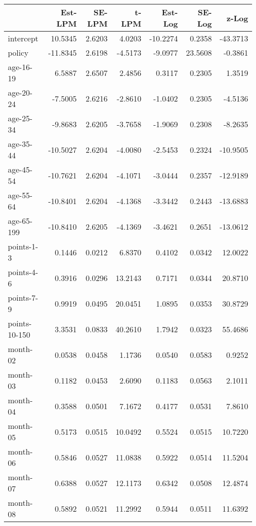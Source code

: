\documentclass[10pt]{article}
\begin{document}

\begin{table}[ht]
\centering
\begin{tabular}{lrrrrrr}
  \hline
 & Est-LPM & SE-LPM & t-LPM & Est-Log & SE-Log & z-Log \\ 
  \hline
intercept & 10.5345 & 2.6203 & 4.0203 & -10.2274 & 0.2358 & -43.3713 \\ 
  policy & -11.8345 & 2.6198 & -4.5173 & -9.0977 & 23.5608 & -0.3861 \\ 
  age-16-19 & 6.5887 & 2.6507 & 2.4856 & 0.3117 & 0.2305 & 1.3519 \\ 
  age-20-24 & -7.5005 & 2.6216 & -2.8610 & -1.0402 & 0.2305 & -4.5136 \\ 
  age-25-34 & -9.8683 & 2.6205 & -3.7658 & -1.9069 & 0.2308 & -8.2635 \\ 
  age-35-44 & -10.5027 & 2.6204 & -4.0080 & -2.5453 & 0.2324 & -10.9505 \\ 
  age-45-54 & -10.7621 & 2.6204 & -4.1071 & -3.0444 & 0.2357 & -12.9189 \\ 
  age-55-64 & -10.8401 & 2.6204 & -4.1368 & -3.3442 & 0.2443 & -13.6883 \\ 
  age-65-199 & -10.8410 & 2.6205 & -4.1369 & -3.4621 & 0.2651 & -13.0612 \\ 
  points-1-3 & 0.1446 & 0.0212 & 6.8370 & 0.4102 & 0.0342 & 12.0022 \\ 
  points-4-6 & 0.3916 & 0.0296 & 13.2143 & 0.7171 & 0.0344 & 20.8710 \\ 
  points-7-9 & 0.9919 & 0.0495 & 20.0451 & 1.0895 & 0.0353 & 30.8729 \\ 
  points-10-150 & 3.3531 & 0.0833 & 40.2610 & 1.7942 & 0.0323 & 55.4686 \\ 
  month-02 & 0.0538 & 0.0458 & 1.1736 & 0.0540 & 0.0583 & 0.9252 \\ 
  month-03 & 0.1182 & 0.0453 & 2.6090 & 0.1183 & 0.0563 & 2.1011 \\ 
  month-04 & 0.3588 & 0.0501 & 7.1672 & 0.4177 & 0.0531 & 7.8610 \\ 
  month-05 & 0.5173 & 0.0515 & 10.0492 & 0.5524 & 0.0515 & 10.7220 \\ 
  month-06 & 0.5846 & 0.0527 & 11.0838 & 0.5922 & 0.0514 & 11.5204 \\ 
  month-07 & 0.6388 & 0.0527 & 12.1173 & 0.6342 & 0.0508 & 12.4874 \\ 
  month-08 & 0.5892 & 0.0521 & 11.2992 & 0.5944 & 0.0511 & 11.6392 \\ 

\end{tabular}
\end{table}
\end{document}
